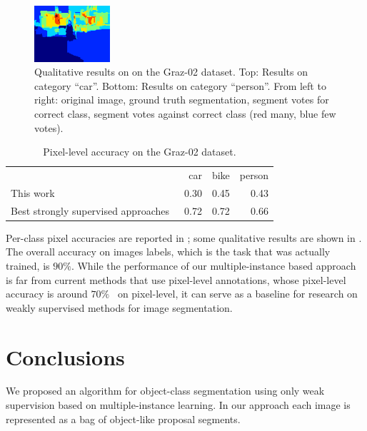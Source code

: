 \begin{figure}[tbp]
\begin{center}
        \includegraphics[width=28mm]{images/person1_neg.png}\hspace*{0.7ex}
	\end{center}
        \caption{Qualitative results on on the Graz-02 dataset. Top: Results on
        category ``car''. Bottom: Results on category ``person''. From left to
        right: original image, ground truth segmentation, segment votes for
        correct class, segment votes against correct class (red many, blue few votes).}
\end{figure}

\begin{table}
    \centering
    \caption{Pixel-level accuracy on the Graz-02 dataset.}
    \begin{tabularx}{0.8\textwidth}{lRRR}
    \toprule
                & car & bike & person \\
    \cmidrule(l){2-2}
    \cmidrule(l){3-3}
    \cmidrule(l){4-4}
        This work&   0.30&  0.45&  0.43 \\
        Best strongly supervised approaches~\citep{fulkerson2009class,schulz2011}&   0.72&  0.72&  0.66 \\
    \bottomrule
    \end{tabularx}
\end{table}
Per-class pixel accuracies are reported in ; some qualitative results are shown in . The overall
accuracy on images labels, which is the task that was actually trained, is $90\%$.
While the performance of our multiple-instance based approach is far
from current methods that use pixel-level annotations, whose pixel-level accuracy is around $70\%$~\citep{fulkerson2009class,schulz2011} on pixel-level,
it can serve as a baseline for research on weakly supervised methods for image segmentation.

\section{Conclusions}
We proposed an algorithm for object-class segmentation using only weak supervision based on
multiple-instance learning. In our approach each image is represented as a bag of object-like
proposal segments.

